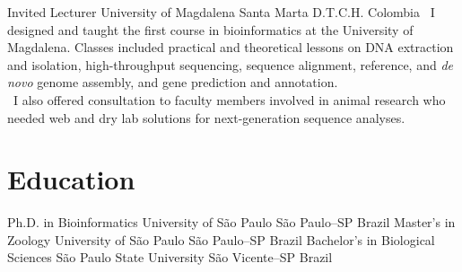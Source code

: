 \documentclass[11pt, letterpaper, roman]{moderncv}
\begin{document}
    	{Invited Lecturer}
    	{University of Magdalena}
    	{Santa Marta D.T.C.H.}
    	{Colombia}
    	{
    	    \textbullet~I designed and taught the first course in bioinformatics at the University of Magdalena. Classes included practical and theoretical lessons on DNA extraction and isolation, high-throughput sequencing, sequence alignment, reference, and \textit{de novo} genome assembly, and gene prediction and annotation.\\
    	    \textbullet~I also offered consultation to faculty members involved in animal research who needed web and dry lab solutions for next-generation sequence analyses.
    	}



\section{Education}
		{Ph.D. in Bioinformatics}
		{University of São Paulo}
		{São Paulo--SP}
		{Brazil}
		{}
		{Master's in Zoology}
		{University of São Paulo}
		{São Paulo--SP}
		{Brazil}
		{}
		{Bachelor's in Biological Sciences}
		{São Paulo State University}
		{São Vicente--SP}
		{Brazil}
		{}




\end{document}
